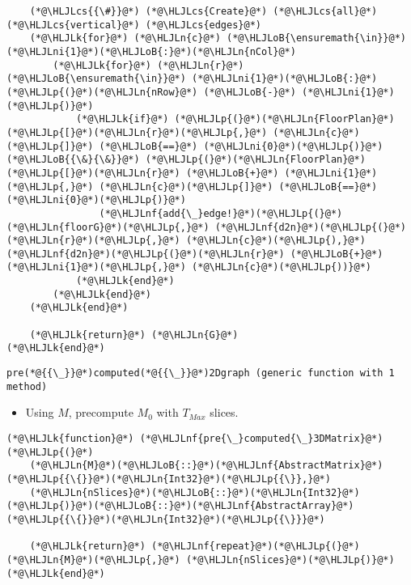 \documentclass[12pt,a4paper]{article}
\newcommand{\HLJLk}[1]{\textcolor[RGB]{148,91,176}{\textbf{#1}}}
\newcommand{\HLJLn}[1]{#1}
\newcommand{\HLJLnf}[1]{\textcolor[RGB]{66,102,213}{#1}}
\newcommand{\HLJLni}[1]{\textcolor[RGB]{59,151,46}{#1}}
\newcommand{\HLJLoB}[1]{\textcolor[RGB]{102,102,102}{\textbf{#1}}}
\newcommand{\HLJLp}[1]{#1}
\newcommand{\HLJLcs}[1]{\textcolor[RGB]{153,153,119}{\textit{#1}}}
\begin{document}
\begin{lstlisting}
    (*@\HLJLcs{{\#}}@*) (*@\HLJLcs{Create}@*) (*@\HLJLcs{all}@*) (*@\HLJLcs{vertical}@*) (*@\HLJLcs{edges}@*)
    (*@\HLJLk{for}@*) (*@\HLJLn{c}@*) (*@\HLJLoB{\ensuremath{\in}}@*) (*@\HLJLni{1}@*)(*@\HLJLoB{:}@*)(*@\HLJLn{nCol}@*)
        (*@\HLJLk{for}@*) (*@\HLJLn{r}@*) (*@\HLJLoB{\ensuremath{\in}}@*) (*@\HLJLni{1}@*)(*@\HLJLoB{:}@*)(*@\HLJLp{(}@*)(*@\HLJLn{nRow}@*) (*@\HLJLoB{-}@*) (*@\HLJLni{1}@*)(*@\HLJLp{)}@*)
            (*@\HLJLk{if}@*) (*@\HLJLp{(}@*)(*@\HLJLn{FloorPlan}@*)(*@\HLJLp{[}@*)(*@\HLJLn{r}@*)(*@\HLJLp{,}@*) (*@\HLJLn{c}@*)(*@\HLJLp{]}@*) (*@\HLJLoB{==}@*) (*@\HLJLni{0}@*)(*@\HLJLp{)}@*) (*@\HLJLoB{{\&}{\&}}@*) (*@\HLJLp{(}@*)(*@\HLJLn{FloorPlan}@*)(*@\HLJLp{[}@*)(*@\HLJLn{r}@*) (*@\HLJLoB{+}@*) (*@\HLJLni{1}@*)(*@\HLJLp{,}@*) (*@\HLJLn{c}@*)(*@\HLJLp{]}@*) (*@\HLJLoB{==}@*) (*@\HLJLni{0}@*)(*@\HLJLp{)}@*)
                (*@\HLJLnf{add{\_}edge!}@*)(*@\HLJLp{(}@*)(*@\HLJLn{floorG}@*)(*@\HLJLp{,}@*) (*@\HLJLnf{d2n}@*)(*@\HLJLp{(}@*)(*@\HLJLn{r}@*)(*@\HLJLp{,}@*) (*@\HLJLn{c}@*)(*@\HLJLp{),}@*) (*@\HLJLnf{d2n}@*)(*@\HLJLp{(}@*)(*@\HLJLn{r}@*) (*@\HLJLoB{+}@*) (*@\HLJLni{1}@*)(*@\HLJLp{,}@*) (*@\HLJLn{c}@*)(*@\HLJLp{))}@*)
            (*@\HLJLk{end}@*)
        (*@\HLJLk{end}@*)
    (*@\HLJLk{end}@*)

    (*@\HLJLk{return}@*) (*@\HLJLn{G}@*)
(*@\HLJLk{end}@*)
\end{lstlisting}

\begin{lstlisting}
pre(*@{{\_}}@*)computed(*@{{\_}}@*)2Dgraph (generic function with 1 method)
\end{lstlisting}


\begin{itemize}
\item Using $M$, precompute $M_0$ with $T_{Max}$ slices.

\end{itemize}

\begin{lstlisting}
(*@\HLJLk{function}@*) (*@\HLJLnf{pre{\_}computed{\_}3DMatrix}@*)(*@\HLJLp{(}@*)
    (*@\HLJLn{M}@*)(*@\HLJLoB{::}@*)(*@\HLJLnf{AbstractMatrix}@*)(*@\HLJLp{{\{}}@*)(*@\HLJLn{Int32}@*)(*@\HLJLp{{\}},}@*)
    (*@\HLJLn{nSlices}@*)(*@\HLJLoB{::}@*)(*@\HLJLn{Int32}@*)(*@\HLJLp{)}@*)(*@\HLJLoB{::}@*)(*@\HLJLnf{AbstractArray}@*)(*@\HLJLp{{\{}}@*)(*@\HLJLn{Int32}@*)(*@\HLJLp{{\}}}@*)

    (*@\HLJLk{return}@*) (*@\HLJLnf{repeat}@*)(*@\HLJLp{(}@*)(*@\HLJLn{M}@*)(*@\HLJLp{,}@*) (*@\HLJLn{nSlices}@*)(*@\HLJLp{)}@*)
(*@\HLJLk{end}@*)
\end{lstlisting}
\end{document}

